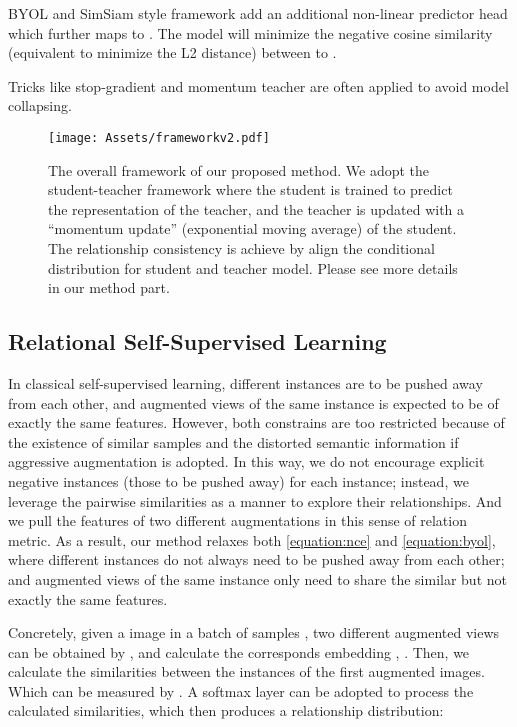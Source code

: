 \documentclass{article}
\newcommand{\<}{\left\langle}
\renewcommand{\>}{\right\rangle}
\begin{document}
BYOL \cite{byol} and SimSiam \cite{SimSiam} style framework add an additional non-linear predictor head  which further maps  to . The model will minimize the negative cosine similarity (equivalent to minimize the L2 distance) between  to .

Tricks like stop-gradient and momentum teacher are often applied to avoid model collapsing.

\begin{figure*}
    \centering
    \texttt{[image: Assets/frameworkv2.pdf]}
    \vspace{-10pt}
    \caption{The overall framework of our proposed method. We adopt the student-teacher framework where the student is trained to predict the representation of the teacher, and the teacher is updated with a “momentum update” (exponential moving average) of the student. The relationship consistency is achieve by align the conditional distribution for student and teacher model. Please see more details in our method part.}
    \label{fig:framework}
    \vspace{-10pt}
\end{figure*}

\subsection{Relational Self-Supervised Learning}
In classical self-supervised learning, different instances are to be pushed away from each other, and augmented views of the same instance is expected to be of exactly the same features. However, both constrains are too restricted because of the existence of similar samples and the distorted semantic information if aggressive augmentation is adopted. In this way, we do not encourage explicit negative instances (those to be pushed away) for each instance; instead, we leverage the pairwise similarities as a manner to explore their relationships. And we pull the features of two different augmentations in this sense of relation metric. As a result, our method relaxes both \eqref{equation:nce} and \eqref{equation:byol}, where different instances do not always need to be pushed away from each other; and augmented views of the same instance only need to share the similar but not exactly the same features. 

Concretely, given a image  in a batch of samples , two different augmented views can be obtained by ,  and calculate the corresponds embedding  , . Then, we calculate the similarities between the instances of the first augmented images. Which can be measured by . A softmax layer can be adopted to process the calculated similarities, which then produces a relationship distribution:
\end{document}
